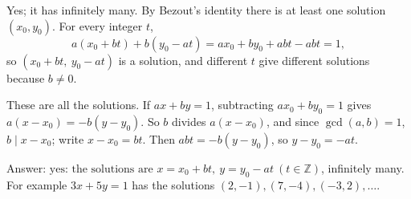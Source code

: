 Yes; it has infinitely many. By Bezout's identity there is at least one solution $(x_0,y_0)$. For every integer $t$,
\[
a(x_0+bt)+b(y_0-at)=ax_0+by_0+abt-abt=1,
\]
so $(x_0+bt,\ y_0-at)$ is a solution, and different $t$ give different solutions because $b\ne0$.

These are all the solutions. If $ax+by=1$, subtracting $ax_0+by_0=1$ gives $a(x-x_0)=-b(y-y_0)$. So $b$ divides $a(x-x_0)$, and since $\gcd(a,b)=1$, $b\mid x-x_0$; write $x-x_0=bt$. Then $abt=-b(y-y_0)$, so $y-y_0=-at$.

Answer: $\boxed{\text{yes: the solutions are }x=x_0+bt,\ y=y_0-at\ (t\in\mathbb Z)}$, infinitely many. For example $3x+5y=1$ has the solutions $(2,-1),(7,-4),(-3,2),\dots$.
